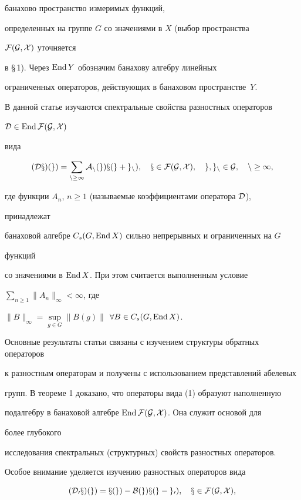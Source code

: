 банахово пространство измеримых функций, 


определенных на группе $G$ со значениями в $X$ (выбор пространства 


$\cal F(G,X)$ уточняется 


в \S\,1). Через $\operatorname{End} Y$ обозначим банахову алгебру линейных 


ограниченных операторов, действующих в банаховом пространстве~$Y$. 


 


В данной статье изучаются спектральные свойства разностных операторов 


$\cal D\in\operatorname{End}\cal F(G,X)$ 


вида 


\begin{equation} 


(\cal D x)(g)=\sum_{n\ge 1}A_n(g)x(g+g_n),\quad 


x\in\cal F(G,X),\quad g,g_n\in G,\quad n\ge 1, 


\end{equation} 


где функции $A_n$, $n\ge 1$ (называемые коэффициентами оператора $\cal D$), 


принадлежат 


банаховой алгебре $C_s(G,\operatorname{End} X)$ сильно непрерывных и ограниченных на $G$ 


функций 


со значениями в $\operatorname{End} X$. При этом считается выполненным условие 


$\sum\limits_{n\ge 1}\|A_n\|_\infty<\infty$, где 


$\|B\|_\infty=\sup\limits_{g\in G}\|B(g)\|$ $\forall B\in C_s(G,\operatorname{End} X)$. 


Основные результаты статьи связаны с изучением структуры обратных операторов 


к разностным операторам и получены с использованием представлений абелевых 


групп. В теореме 1 доказано, что операторы вида (1) образуют наполненную 


подалгебру в банаховой алгебре $\operatorname{End}\cal F(G,X)$. Она служит основой для 


более глубокого 


исследования спектральных (структурных) свойств разностных операторов. 


Особое внимание уделяется изучению разностных операторов вида 


\begin{equation} 


(\cal D_0x)(g)=x(g)-B(g)x(g-g_0),\quad x\in\cal F(G,X), 


\end{equation} 


